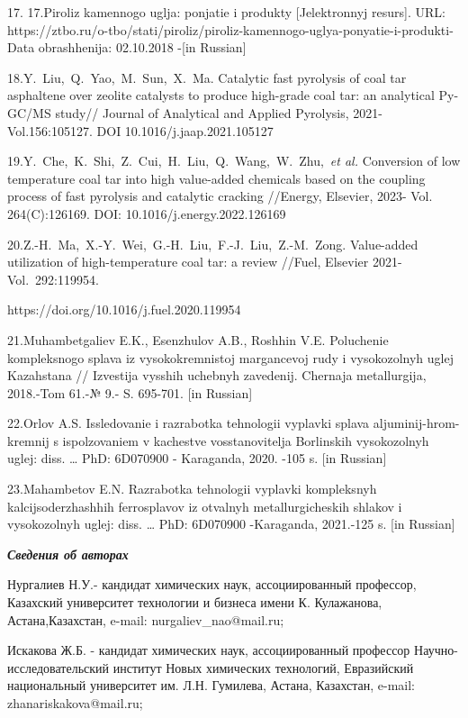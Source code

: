 17. 17.Piroliz kamennogo uglja: ponjatie i produkty {[}Jelektronnyj
resurs{]}. URL:
https://ztbo.ru/o-tbo/stati/piroliz/piroliz-kamennogo-uglya-ponyatie-i-produkti-Data
obrashhenija: 02.10.2018 -{[}in Russian{]}

18.Y.~Liu,~Q.~Yao,~M.~Sun,~X.~Ma. Catalytic fast pyrolysis of coal tar
asphaltene over zeolite catalysts to produce high-grade coal tar: an
analytical Py-GC/MS study// Journal of Analytical and Applied Pyrolysis,
2021-Vol.156:105127. DOI 10.1016/j.jaap.2021.105127

19.Y.~Che,~K.~Shi,~Z.~Cui,~H.~Liu,~Q.~Wang,~W.~Zhu,~\emph{et al.}
Conversion of low temperature coal tar into high value-added chemicals
based on the coupling process of fast pyrolysis and catalytic cracking
//Energy, Elsevier, 2023- Vol. 264(C):126169. DOI:
10.1016/j.energy.2022.126169

20.Z.-H.~Ma,~X.-Y.~Wei,~G.-H.~Liu,~F.-J.~Liu,~Z.-M.~Zong. Value-added
utilization of high-temperature coal tar: a review //Fuel, Elsevier
2021- Vol.~292:119954.

https://doi.org/10.1016/j.fuel.2020.119954

21.Muhambetgaliev E.K., Esenzhulov A.B., Roshhin V.E. Poluchenie
kompleksnogo splava iz vysokokremnistoj margancevoj rudy i
vysokozol\textquotesingle nyh uglej Kazahstana // Izvestija vysshih
uchebnyh zavedenij. Chernaja metallurgija, 2018.-Tom 61.-№ 9.- S.
695-701. {[}in Russian{]}

22.Orlov A.S. Issledovanie i razrabotka tehnologii vyplavki splava
aljuminij-hrom-kremnij s ispol\textquotesingle zovaniem v kachestve
vosstanovitelja Borlinskih vysokozol\textquotesingle nyh uglej: diss.
\ldots{} PhD: 6D070900 - Karaganda, 2020. -105 s. {[}in Russian{]}

23.Mahambetov E.N. Razrabotka tehnologii vyplavki kompleksnyh
kal\textquotesingle cijsoderzhashhih ferrosplavov iz
otval\textquotesingle nyh metallurgicheskih shlakov i
vysokozol\textquotesingle nyh uglej: diss. \ldots{} PhD: 6D070900
-Karaganda, 2021.-125 s. {[}in Russian{]}

\emph{{\bfseries Сведения об авторах}}

Нургалиев Н.У.- кандидат химических наук, ассоциированный профессор,
Казахский университет технологии и бизнеса имени К. Кулажанова,
Астана,Казахстан, e-mail: nurgaliev\_nao@mail.ru;

Искакова Ж.Б. - кандидат химических наук, ассоциированный профессор
Научно-исследовательский институт Новых химических технологий,
Евразийский национальный университет им. Л.Н. Гумилева, Астана,
Казахстан, e-mail: zhanariskakova@mail.ru;

